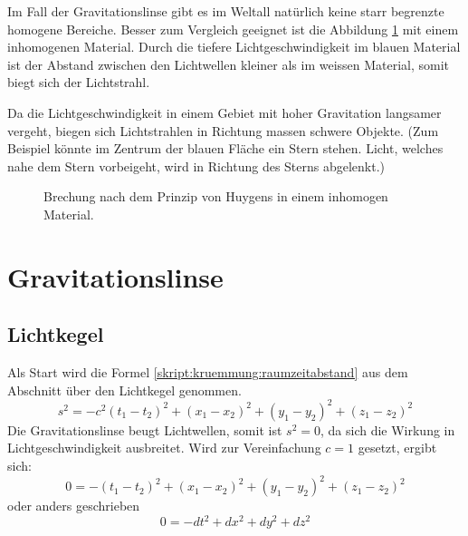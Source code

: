 \begin{refsection}
Im Fall der Gravitationslinse gibt es im Weltall natürlich keine starr
begrenzte homogene Bereiche.  Besser zum Vergleich geeignet ist die
Abbildung \ref{fig:huygens3} mit einem inhomogenen Material.  Durch
die tiefere Lichtgeschwindigkeit im blauen Material ist der Abstand
zwischen den Lichtwellen kleiner als im weissen Material, somit biegt
sich der Lichtstrahl.

Da die Lichtgeschwindigkeit in einem Gebiet mit hoher Gravitation
langsamer vergeht, biegen sich Lichtstrahlen in Richtung massen
schwere Objekte.  (Zum Beispiel könnte im Zentrum der blauen Fläche
ein Stern stehen.  Licht, welches nahe dem Stern vorbeigeht, wird in
Richtung des Sterns abgelenkt.)

\begin{figure}
  \centering
  
  \caption{Brechung nach dem Prinzip von Huygens in einem inhomogen
    Material.}
  \label{fig:huygens3}
\end{figure}


\section{Gravitationslinse}
\subsection{Lichtkegel}
Als Start wird die Formel \ref{skript:kruemmung:raumzeitabstand} aus
dem Abschnitt über den Lichtkegel genommen.
\begin{equation*}
  s^2 = -c^2 (t_1-t_2)^2 + (x_1-x_2)^2 + (y_1-y_2)^2 + (z_1-z_2)^2
\end{equation*}
Die Gravitationslinse beugt Lichtwellen, somit ist \(s^2=0\), da sich
die Wirkung in Lichtgeschwindigkeit ausbreitet.  Wird zur
Vereinfachung \(c=1\) gesetzt, ergibt sich:
\begin{equation*}
  0 = -(t_1-t_2)^2 + (x_1-x_2)^2 + (y_1-y_2)^2 + (z_1-z_2)^2
\end{equation*}
oder anders geschrieben
\begin{equation*}
  0 = -dt^2 + dx^2 + dy^2 + dz^2
\end{equation*}


\end{refsection}
